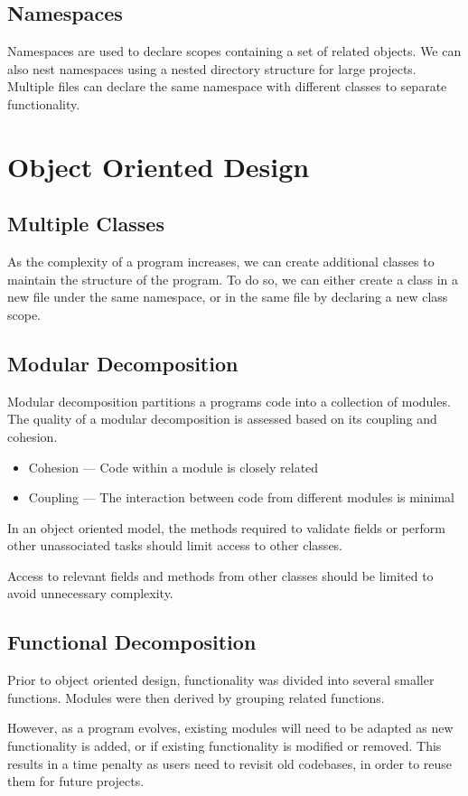 \documentclass{article}
\begin{document}
\subsection{Namespaces}
Namespaces are used to declare scopes containing a set of related objects. We can also nest namespaces 
using a nested directory structure for large projects. Multiple files can declare the same namespace 
with different classes to separate functionality.
\section{Object Oriented Design}
\subsection{Multiple Classes}
As the complexity of a program increases, we can create additional classes to maintain the structure of 
the program. To do so, we can either create a class in a new file under the same namespace, or in the 
same file by declaring a new class scope.
\subsection{Modular Decomposition}
Modular decomposition partitions a programs code into a collection of modules. 
The quality of a modular decomposition is assessed based on its coupling and cohesion.
\begin{itemize}
    \item Cohesion --- Code within a module is closely related
    \item Coupling --- The interaction between code from different modules is minimal
\end{itemize}
In an object oriented model, the methods required to validate fields or perform other 
unassociated tasks should limit access to other classes. 

Access to relevant fields and methods from other classes should be 
limited to avoid unnecessary complexity.
\subsection{Functional Decomposition}
Prior to object oriented design, functionality was divided into several smaller functions.
Modules were then derived by grouping related functions.

However, as a program evolves, existing modules will need to be adapted
as new functionality is added, or if existing functionality is modified or removed.
This results in a time penalty as users need to revisit old codebases,
in order to reuse them for future projects.
\end{document}
